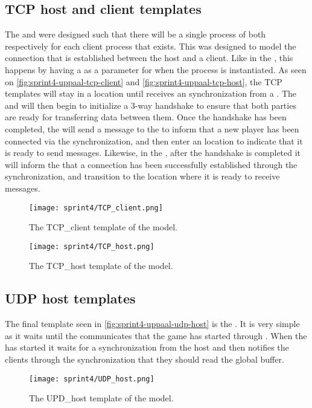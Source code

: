 \subsection*{TCP host and client templates}
The  and  were designed such that there will be a single process of both respectively for each client process that exists.
This was designed to model the connection that is established between the host and a client.
Like in the , this happens by having a  as a parameter for when the process is instantiated.
As seen on \autoref{fig:sprint4-uppaal-tcp-client} and \autoref{fig:sprint4-uppaal-tcp-host}, the TCP templates will stay in a  location until  receives an  synchronization from a .
The  and  will then begin to initialize a 3-way handshake to ensure that both parties are ready for transferring data between them.
Once the handshake has been completed, the  will send a message to the  to inform that a new player has been connected via the  synchronization, and then enter an  location to indicate that it is ready to send messages.
Likewise, in the , after the handshake is completed it will inform the  that a connection has been successfully established through the  synchronization, and transition to the  location where it is ready to receive messages.

\begin{figure}[h]
    \centering
    \texttt{[image: sprint4/TCP\_client.png]}
    \caption{The TCP\_client template of the \uppaal model.}
    \label{fig:sprint4-uppaal-tcp-client}
\end{figure}

\begin{figure}[h]
    \centering
    \texttt{[image: sprint4/TCP\_host.png]}
    \caption{The TCP\_host template of the \uppaal model.}
    \label{fig:sprint4-uppaal-tcp-host}
\end{figure}

\subsection*{UDP host templates}
The final template seen in \autoref{fig:sprint4-uppaal-udp-host} is the .
It is very simple as it waits until the  communicates that the game has started through .
When the  has started it waits for a  synchronization from the host and then notifies the clients through the  synchronization that they should read the global buffer.
\begin{figure}[h]
    \centering
    \texttt{[image: sprint4/UDP\_host.png]}
    \caption{The UPD\_host template of the \uppaal model.}
    \label{fig:sprint4-uppaal-udp-host}
\end{figure}

